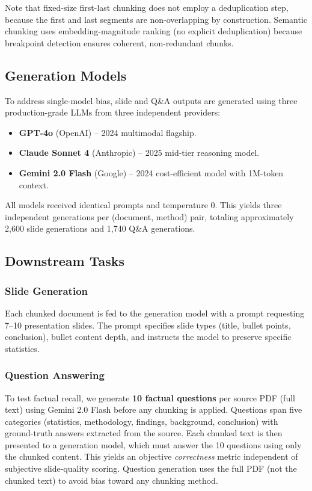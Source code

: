 \documentclass[journal]{IEEEtran}
\begin{document}
Note that fixed-size first-last chunking does not employ a deduplication step, because the first and last segments are non-overlapping by construction. Semantic chunking uses embedding-magnitude ranking (no explicit deduplication) because breakpoint detection ensures coherent, non-redundant chunks.

\subsection{Generation Models}
\label{sec:gen-models}

To address single-model bias, slide and Q\&A outputs are generated using three production-grade LLMs from three independent providers:
\begin{itemize}
    \item \textbf{GPT-4o} (OpenAI) -- 2024 multimodal flagship.
    \item \textbf{Claude Sonnet 4} (Anthropic) -- 2025 mid-tier reasoning model.
    \item \textbf{Gemini 2.0 Flash} (Google) -- 2024 cost-efficient model with 1M-token context.
\end{itemize}
All models received identical prompts and temperature 0. This yields three independent generations per (document, method) pair, totaling approximately 2{,}600 slide generations and 1{,}740 Q\&A generations.

\subsection{Downstream Tasks}

\subsubsection{Slide Generation}
Each chunked document is fed to the generation model with a prompt requesting 7--10 presentation slides. The prompt specifies slide types (title, bullet points, conclusion), bullet content depth, and instructs the model to preserve specific statistics.

\subsubsection{Question Answering}
To test factual recall, we generate \textbf{10 factual questions} per source PDF (full text) using Gemini 2.0 Flash before any chunking is applied. Questions span five categories (statistics, methodology, findings, background, conclusion) with ground-truth answers extracted from the source. Each chunked text is then presented to a generation model, which must answer the 10 questions using only the chunked content. This yields an objective \textit{correctness} metric independent of subjective slide-quality scoring. Question generation uses the full PDF (not the chunked text) to avoid bias toward any chunking method.
\end{document}
